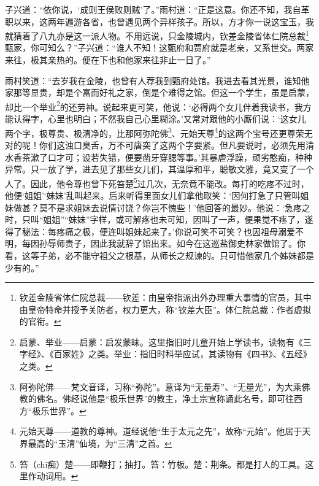 \par 子兴道：“依你说，‘成则王侯败则贼’了。”雨村道：“正是这意。你还不知，我自革职以来，这两年遍游各省，也曾遇见两个异样孩子。所以，方才你一说这宝玉，我就猜着了八九亦是这一派人物。不用远说，只金陵城内，钦差金陵省体仁院总裁\footnote{钦差金陵省体仁院总裁——钦差：由皇帝指派出外办理重大事情的官员，其中由皇帝特命并授予关防者，权力更大，称“钦差大臣”。体仁院总裁：作者虚拟的官衔。}甄家，你可知么？”子兴道：“谁人不知！这甄府和贾府就是老亲，又系世交。两家来往，极其亲热的。便在下也和他家来往非止一日了。”
\par 雨村笑道：“去岁我在金陵，也曾有人荐我到甄府处馆。我进去看其光景，谁知他家那等显贵，却是个富而好礼之家，倒是个难得之馆。但这一个学生，虽是启蒙，却比一个举业\footnote{启蒙、举业——启蒙：启发蒙昧。这里指旧时儿童开始上学读书，读物有《三字经》、《百家姓》之类。举业：指旧时科举应试，其读物有《四书》、《五经》之类。}的还劳神。说起来更可笑，他说：‘必得两个女儿伴着我读书，我方能认得字，心里也明白；不然我自己心里糊涂。’又常对跟他的小厮们说：‘这女儿两个字，极尊贵、极清净的，比那阿弥陀佛\footnote{阿弥陀佛——梵文音译，习称“弥陀”。意译为“无量寿”、“无量光”，为大乘佛教的佛名。佛经说他是“极乐世界”的教主，净土宗宣称诵此名号，即可往西方“极乐世界”。}、元始天尊\footnote{元始天尊——道教的尊神。道经说他“生于太元之先”，故称“元始”。他居于天界最高的“玉清”仙境，为“三清”之首。}的这两个宝号还更尊荣无对的呢！你们这浊口臭舌，万不可唐突了这两个字要紧。但凡要说时，必须先用清水香茶漱了口才可；设若失错，便要凿牙穿腮等事。’其暴虐浮躁，顽劣憨痴，种种异常。只一放了学，进去见了那些女儿们，其温厚和平，聪敏文雅，竟又变了一个人了。因此，他令尊也曾下死笞楚\footnote{笞（chī痴）楚——即鞭打；抽打。笞：竹板。楚：荆条。都是打人的工具。这里作动词用。}过几次，无奈竟不能改。每打的吃疼不过时，他便‘姐姐’‘妹妹’乱叫起来。后来听得里面女儿们拿他取笑：‘因何打急了只管叫姐妹做甚？莫不是求姐妹去说情讨饶？你岂不愧些！’他回答的最妙。他说：‘急疼之时，只叫“姐姐”“妹妹”字样，或可解疼也未可知，因叫了一声，便果觉不疼了，遂得了秘法：每疼痛之极，便连叫姐妹起来了。’你说可笑不可笑？也因祖母溺爱不明，每因孙辱师责子，因此我就辞了馆出来。如今在这巡盐御史林家做馆了。你看，这等子弟，必不能守祖父之根基，从师长之规谏的。只可惜他家几个姊妹都是少有的。”

